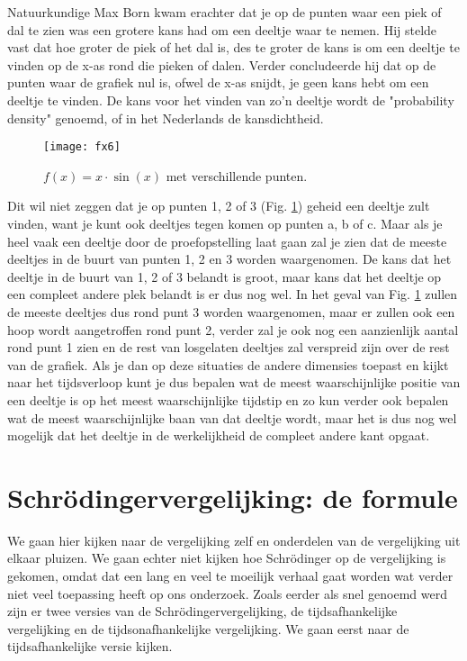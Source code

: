 \documentclass[11pt,fleqn]{book} %
\begin{document}
Natuurkundige Max Born kwam erachter dat je op de punten waar een piek of dal te zien was een grotere kans had om een deeltje waar te nemen. Hij stelde vast dat hoe groter de piek of het dal is, des te groter de kans is om een deeltje te vinden op de x-as rond die pieken of dalen. Verder concludeerde hij dat op de punten waar de grafiek nul is, ofwel de x-as snijdt, je geen kans hebt om een deeltje te vinden. De kans voor het vinden van zo’n deeltje wordt de "probability density" genoemd, of in het Nederlands de kansdichtheid. 
\begin{figure}[h]
	\centering\texttt{[image: fx6]}
	\caption{$f(x)=x\cdot\sin{(x)}$ met verschillende punten.}
	\label{fig:fx6}
\end{figure}
Dit wil niet zeggen dat je op punten 1, 2 of 3 (Fig. \ref{fig:fx6}) geheid een deeltje zult vinden, want je kunt ook deeltjes tegen komen op punten a, b of c. Maar als je heel vaak een deeltje door de proefopstelling laat gaan zal je zien dat de meeste deeltjes in de buurt van punten 1, 2 en 3 worden waargenomen. De kans dat het deeltje in de buurt van 1, 2 of 3 belandt is groot, maar kans dat het deeltje op een compleet andere plek belandt is er dus nog wel. In het geval van Fig. \ref{fig:fx6} zullen de meeste deeltjes dus rond punt 3 worden waargenomen, maar er zullen ook een hoop wordt aangetroffen rond punt 2, verder zal je ook nog een aanzienlijk aantal rond punt 1 zien en de rest van losgelaten deeltjes zal verspreid zijn over de rest van de grafiek.
Als je dan op deze situaties de andere dimensies toepast en kijkt naar het tijdsverloop kunt je dus bepalen wat de meest waarschijnlijke positie van een deeltje is op het meest waarschijnlijke tijdstip en zo kun verder ook bepalen wat de meest waarschijnlijke baan van dat deeltje wordt, maar het is dus nog wel mogelijk dat het deeltje in de werkelijkheid de compleet andere kant opgaat.

\section{Schrödingervergelijking: de formule}
We gaan hier kijken naar de vergelijking zelf en onderdelen van de vergelijking uit elkaar pluizen. We gaan echter niet kijken hoe Schrödinger op de vergelijking is gekomen, omdat dat een lang en veel te moeilijk verhaal gaat worden wat verder niet veel toepassing heeft op ons onderzoek. Zoals eerder als snel genoemd werd zijn er twee versies van de Schrödingervergelijking, de tijdsafhankelijke vergelijking en de tijdsonafhankelijke vergelijking. We gaan eerst naar de tijdsafhankelijke versie kijken.
\end{document}
